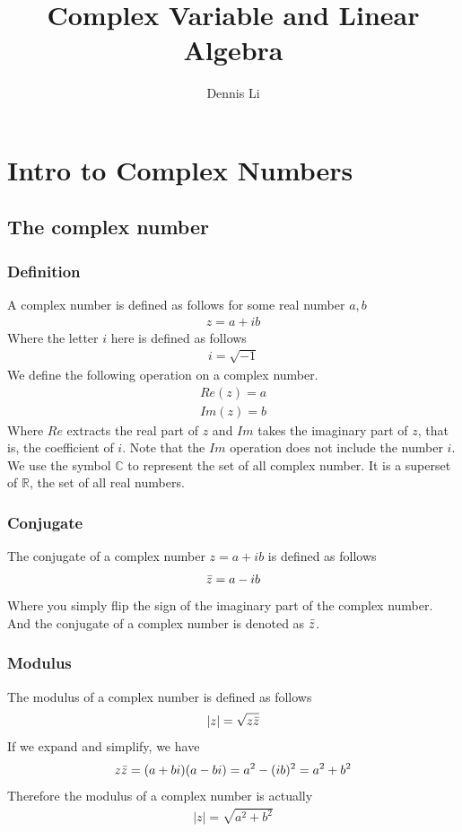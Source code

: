 \documentclass[12pt]{book}
\title{\textbf{Complex Variable and Linear Algebra}}
\author{Dennis Li}
\newcommand{\R}{\mathbb{R}}
\newcommand{\C}{\mathbb{C}}
\newcommand{\abso}[1]{\left|#1 \right|}
\begin{document}
\maketitle

\tableofcontents

\chapter{Intro to Complex Numbers}

\section{The complex number}
\subsection{Definition}
A complex number is defined as follows for some real number $a,b$
\begin{align}
    z = a+ib
\end{align}
Where the letter $i$ here is defined as follows
\begin{align}
    i = \sqrt{-1}
\end{align}
We define the following operation on a complex number.
\begin{align}
    Re(z) = a\\
    Im(z) = b
\end{align}
Where $Re$ extracts the real part of $z$ and $Im$ takes the imaginary part of $z$, that is, the coefficient of $i$. Note that the $Im$ operation does not include the number $i$. We use the symbol $\C$ to represent the set of all complex number. It is a superset of $\R$, the set of all real numbers. 
\subsection{Conjugate}
The conjugate of a complex number $z = a+ib$ is defined as follows
\begin{align}
    \Bar{z} = a - ib
\end{align}
Where you simply flip the sign of the imaginary part of the complex number. And the conjugate of a complex number is denoted as $\Bar{z}$.
\subsection{Modulus}
The modulus of a complex number is defined as follows
\begin{align}
    \abso{z} = \sqrt{z\Bar{z}}
\end{align}
If we expand and simplify, we have
\[
z\Bar{z}=(a+bi)(a-bi) = a^2 - (ib)^2 = a^2+b^2
\]
Therefore the modulus of a complex number is actually
\begin{align}
    \abso{z} = \sqrt{a^2 + b^2}
\end{align}
\end{document}
